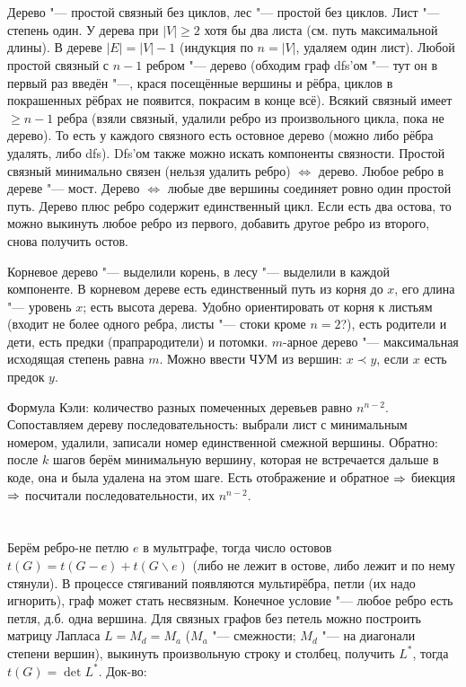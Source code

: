 \section{} %
Дерево "--- простой связный без циклов, лес "--- простой без циклов.
Лист "--- степень один.
У дерева при $|V|\ge 2$ хотя бы два листа (см. путь максимальной длины).
В дереве $|E|=|V|-1$ (индукция по $n=|V|$, удаляем один лист).
Любой простой связный с $n-1$ ребром "--- дерево (обходим граф dfs'ом "--- тут он в первый раз введён "---, крася посещённые вершины и рёбра, циклов в покрашенных
рёбрах не появится, покрасим в конце всё).
Всякий связный имеет $\ge n-1$ ребра (взяли связный, удалили ребро из произвольного цикла, пока не дерево).
То есть у каждого связного есть остовное дерево (можно либо рёбра удалять, либо dfs).
Dfs'ом также можно искать компоненты связности.
Простой связный минимально связен (нельзя удалить ребро) $\iff$ дерево.
Любое ребро в дереве "--- мост.
Дерево $\iff$ любые две вершины соединяет ровно один простой путь.
Дерево плюс ребро содержит единственный цикл.
Если есть два остова, то можно выкинуть любое ребро из первого, добавить другое ребро из второго, снова получить остов.

Корневое дерево "--- выделили корень, в лесу "--- выделили в каждой компоненте.
В корневом дереве есть единственный путь из корня до $x$, его длина "--- уровень $x$;
есть высота дерева.
Удобно ориентировать от корня к листьям (входит не более одного ребра, листы "--- стоки \TODO кроме $n=2$?),
есть родители и дети, есть предки (прапрародители) и потомки.
$m$-арное дерево "--- максимальная исходящая степень равна $m$.
Можно ввести ЧУМ из вершин: $x \prec y$, если $x$ есть предок $y$.

Формула Кэли: количество разных помеченных деревьев равно $n^{n-2}$.
Сопоставляем дереву последовательность: выбрали лист с минимальным номером, удалили,
записали номер единственной смежной вершины.
Обратно: после $k$ шагов берём минимальную вершину, которая не встречается дальше в коде, она и была
удалена на этом шаге.
Есть отображение и обратное $\Rightarrow$ биекция $\Rightarrow$ посчитали последовательности, их $n^{n-2}$.

\section{} %
Берём ребро-не петлю $e$ в мультграфе, тогда число остовов $t(G)=t(G-e)+t(G\backslash e)$ (либо не лежит в остове, либо лежит и по нему стянули).
В процессе стягиваний появляются мультирёбра, петли (их надо игнорить), граф может стать несвязным.
Конечное условие "--- любое ребро есть петля, д.б. одна вершина.
Для связных графов без петель можно построить матрицу Лапласа $L=M_d=M_a$ ($M_a$ "--- смежности; $M_d$ "--- на диагонали степени вершин),
выкинуть произвольную строку и столбец, получить $L^*$, тогда $t(G)=\det L^*$.
Док-во:

